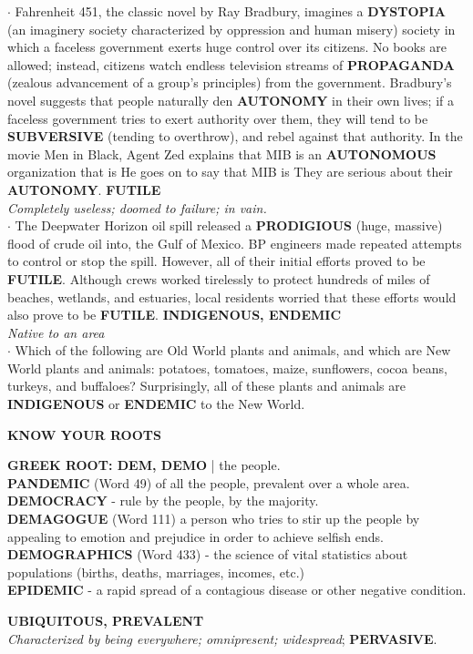 \documentclass{exam}
\begin{document}
\begin{questions}
$\cdot$ Fahrenheit 451, the classic novel by Ray Bradbury, imagines a \textbf{DYSTOPIA} (an imaginery society characterized by oppression and human misery) society in which a faceless government exerts huge control over its citizens. No books are allowed; instead, citizens watch endless television streams of \textbf{PROPAGANDA} (zealous advancement of a group's principles) from the government. Bradbury's novel suggests that people naturally den \textbf{AUTONOMY} in their own lives; if a faceless government tries to exert authority over them, they will tend to be \textbf{SUBVERSIVE} (tending to overthrow), and rebel against that authority. In the movie Men in Black, Agent Zed explains that MIB is an \textbf{AUTONOMOUS} organization that is  He goes on to say that MIB is  They are serious about their \textbf{AUTONOMY}.
\question \textbf{FUTILE}\\ \textit{Completely useless; doomed to failure; in vain.}\\

$\cdot$ The Deepwater Horizon oil spill released a \textbf{PRODIGIOUS} (huge, massive) flood of crude oil into, the Gulf of Mexico. BP engineers made repeated attempts to control or stop the spill. However, all of their initial efforts proved to be \textbf{FUTILE}. Although crews worked tirelessly to protect hundreds of miles of beaches, wetlands, and estuaries, local residents worried that these efforts would also prove to be \textbf{FUTILE}.
\question \textbf{INDIGENOUS, ENDEMIC}\\ \textit{Native to an area}\\ 

$\cdot$ Which of the following are Old World plants and animals, and which are New World plants and animals: potatoes, tomatoes, maize, sunflowers, cocoa beans, turkeys, and buffaloes? Surprisingly, all of these plants and animals are \textbf{INDIGENOUS} or \textbf{ENDEMIC} to the New World.
\begin{tcolorbox}
\begin{center}
\textbf{ KNOW YOUR ROOTS}
\end{center}  
\textbf{GREEK ROOT: DEM, DEMO} | the people.\\  \textbf{PANDEMIC} (Word 49)  of all the people, prevalent over a whole area.\\ 
\textbf{DEMOCRACY} - rule by the people, by the majority.\\ 
\textbf{DEMAGOGUE} (Word 111) a person who tries to stir up the people by appealing to emotion and prejudice in order to achieve selfish ends.\\ \textbf{DEMOGRAPHICS} (Word 433) - the science of vital statistics about populations (births, deaths, marriages, incomes, etc.)\\ 
\textbf{EPIDEMIC} - a rapid spread of a contagious disease or other negative condition.
\end{tcolorbox}
\question \textbf{UBIQUITOUS, PREVALENT}\\ \textit{Characterized by being everywhere; omnipresent; widespread}; \textbf{PERVASIVE}.\\ 


\end{questions}
\end{document}
